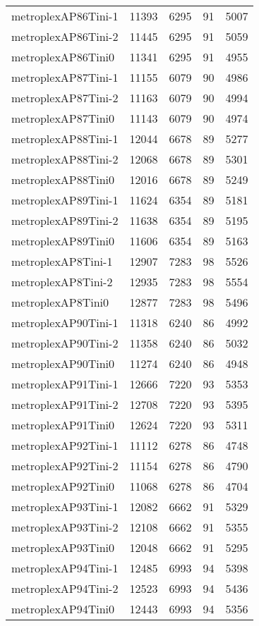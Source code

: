 \begin{longtable}{lrrrr}
metroplexAP86Tini-1 & 11393 & 6295 & 91 & 5007 \\
metroplexAP86Tini-2 & 11445 & 6295 & 91 & 5059 \\
metroplexAP86Tini0 & 11341 & 6295 & 91 & 4955 \\
metroplexAP87Tini-1 & 11155 & 6079 & 90 & 4986 \\
metroplexAP87Tini-2 & 11163 & 6079 & 90 & 4994 \\
metroplexAP87Tini0 & 11143 & 6079 & 90 & 4974 \\
metroplexAP88Tini-1 & 12044 & 6678 & 89 & 5277 \\
metroplexAP88Tini-2 & 12068 & 6678 & 89 & 5301 \\
metroplexAP88Tini0 & 12016 & 6678 & 89 & 5249 \\
metroplexAP89Tini-1 & 11624 & 6354 & 89 & 5181 \\
metroplexAP89Tini-2 & 11638 & 6354 & 89 & 5195 \\
metroplexAP89Tini0 & 11606 & 6354 & 89 & 5163 \\
metroplexAP8Tini-1 & 12907 & 7283 & 98 & 5526 \\
metroplexAP8Tini-2 & 12935 & 7283 & 98 & 5554 \\
metroplexAP8Tini0 & 12877 & 7283 & 98 & 5496 \\
metroplexAP90Tini-1 & 11318 & 6240 & 86 & 4992 \\
metroplexAP90Tini-2 & 11358 & 6240 & 86 & 5032 \\
metroplexAP90Tini0 & 11274 & 6240 & 86 & 4948 \\
metroplexAP91Tini-1 & 12666 & 7220 & 93 & 5353 \\
metroplexAP91Tini-2 & 12708 & 7220 & 93 & 5395 \\
metroplexAP91Tini0 & 12624 & 7220 & 93 & 5311 \\
metroplexAP92Tini-1 & 11112 & 6278 & 86 & 4748 \\
metroplexAP92Tini-2 & 11154 & 6278 & 86 & 4790 \\
metroplexAP92Tini0 & 11068 & 6278 & 86 & 4704 \\
metroplexAP93Tini-1 & 12082 & 6662 & 91 & 5329 \\
metroplexAP93Tini-2 & 12108 & 6662 & 91 & 5355 \\
metroplexAP93Tini0 & 12048 & 6662 & 91 & 5295 \\
metroplexAP94Tini-1 & 12485 & 6993 & 94 & 5398 \\
metroplexAP94Tini-2 & 12523 & 6993 & 94 & 5436 \\
metroplexAP94Tini0 & 12443 & 6993 & 94 & 5356 \\

\end{longtable}
